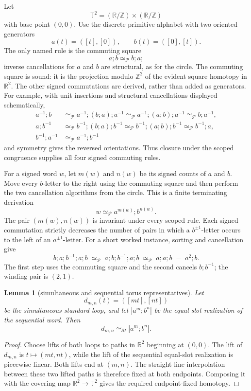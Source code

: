 \documentclass[10pt,reqno]{amsart}
\theoremstyle{definition}
\theoremstyle{plain}
\newtheorem{lemma}[definition]{Lemma}
\theoremstyle{remark}
\newcommand{\RwEq}{\mathrel{\simeq_{\!\mathcal P}}}
\begin{document}
Let
\[
  \mathbb T^2=(\mathbb R/\mathbb Z)\times(\mathbb R/\mathbb Z)
\]
with base point $(0,0)$. Use the discrete primitive alphabet with two
oriented generators
\[
  a(t)=([t],[0]),
  \qquad b(t)=([0],[t]).
\]
The only named rule is the commuting square
\[
  a;b\RwEq b;a;
\]
inverse cancellations for $a$ and $b$ are structural, as for the circle.
The commuting square is sound: it is the projection modulo $\mathbb Z^2$ of
the evident square homotopy in $\mathbb R^2$.  The other signed commutations
are derived, rather than added as generators.  For example, with unit
insertions and structural cancellations displayed schematically,
\[
\begin{aligned}
a^{-1};b
  &\RwEq a^{-1};(b;a);a^{-1}
   \RwEq a^{-1};(a;b);a^{-1}
   \RwEq b;a^{-1},\\
a;b^{-1}
  &\RwEq b^{-1};(b;a);b^{-1}
   \RwEq b^{-1};(a;b);b^{-1}
   \RwEq b^{-1};a,\\
b^{-1};a^{-1}
  &\RwEq a^{-1};b^{-1}
\end{aligned}
\]
and symmetry gives the reversed orientations.  Thus closure under the
scoped congruence supplies all four signed commuting rules.

For a signed word $w$, let $m(w)$ and $n(w)$ be its signed counts of $a$ and
$b$.  Move every $b$-letter to the right using the commuting square and then
perform the two cancellation algorithms from the circle.  This is a finite
terminating derivation
\[
  w\RwEq a^{m(w)};b^{n(w)}.
\]
The pair $(m(w),n(w))$ is invariant under every scoped rule.
Each signed commutation strictly decreases the number of pairs in which a
$b^{\pm1}$-letter occurs to the left of an $a^{\pm1}$-letter.
For a short worked instance, sorting and cancellation give
\[
  b;a;b^{-1};a;b
  \;\RwEq\;a;b;b^{-1};a;b
    \;\RwEq\;a;a;b
  \;=\;a^2;b.
\]
The first step uses the commuting square and the second cancels $b;b^{-1}$;
the winding pair is $(2,1)$.

\begin{lemma}[simultaneous and sequential torus representatives]
\label{lem:torus-sequential}
Let
\[
  d_{m,n}(t)=([mt],[nt])
\]
be the simultaneous standard loop, and let $|a^m;b^n|$ be the equal-slot
realization of the sequential word.  Then
\[
  d_{m,n}\simeq_{\partial I}|a^m;b^n|.
\]
\end{lemma}

\begin{proof}
Choose lifts of both loops to paths in $\mathbb R^2$ beginning at $(0,0)$.
The lift of $d_{m,n}$ is $t\mapsto(mt,nt)$, while the lift of the sequential
equal-slot realization is piecewise linear.  Both lifts end at $(m,n)$.
The straight-line interpolation between these two lifted paths is therefore
fixed at both endpoints.  Composing it with the covering map
$\mathbb R^2\to\mathbb T^2$ gives the required endpoint-fixed homotopy.
\end{proof}
\end{document}
